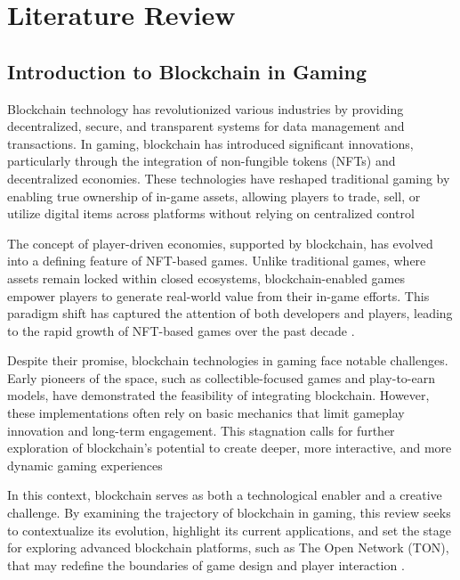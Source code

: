 \chapter{Literature Review}

\section{Introduction to Blockchain in Gaming}

Blockchain technology has revolutionized various industries by providing
decentralized, secure, and transparent systems for data management and
transactions. In gaming, blockchain has introduced significant innovations,
particularly through the integration of non-fungible tokens (NFTs) and
decentralized economies\cite{chen_blockchain_2020, bhand_mage_2024}. These technologies have reshaped traditional gaming by
enabling true ownership of in-game assets, allowing players to trade, sell, or
utilize digital items across platforms without relying on centralized control

The concept of player-driven economies, supported by blockchain, has evolved
into a defining feature of NFT-based games. Unlike traditional games, where
assets remain locked within closed ecosystems, blockchain-enabled games empower
players to generate real-world value from their in-game efforts. This paradigm
shift has captured the attention of both developers and players, leading to the
rapid growth of NFT-based games over the past decade \cite{bhand_mage_2024}.

Despite their promise, blockchain technologies in gaming face notable
challenges. Early pioneers of the space, such as collectible-focused games and
play-to-earn models, have demonstrated the feasibility of integrating
blockchain.\cite{jiang_cryptokitties_2021} However, these implementations often rely on basic mechanics that
limit gameplay innovation and long-term engagement. This stagnation calls for
further exploration of blockchain’s potential to create deeper, more
interactive, and more dynamic gaming experiences

In this context, blockchain serves as both a technological enabler and a
creative challenge. By examining the trajectory of blockchain in gaming, this
review seeks to contextualize its evolution, highlight its current applications,
and set the stage for exploring advanced blockchain platforms, such as The Open
Network (TON), that may redefine the boundaries of game design and player
interaction \cite{stamatakis_blockchain-powered_2024}.


